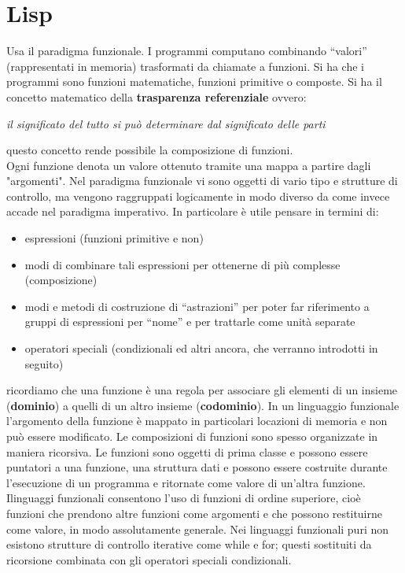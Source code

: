 \documentclass[a4paper,12pt, oneside]{book}
\begin{document}
\chapter{Lisp}
Usa il paradigma funzionale. I programmi computano combinando “valori” (rappresentati in memoria) trasformati da chiamate a funzioni. Si ha che i programmi sono funzioni matematiche, funzioni primitive o composte. Si ha il concetto matematico della \textbf{trasparenza referenziale} ovvero:
\begin{center}
\textit{il significato del tutto si può determinare dal significato delle parti}
\end{center}
questo concetto rende possibile la composizione di funzioni.\\
Ogni funzione denota un valore ottenuto tramite una mappa a
partire dagli "argomenti". Nel paradigma funzionale vi sono oggetti di vario tipo e strutture di controllo, ma vengono raggruppati logicamente in modo
diverso da come invece accade nel paradigma imperativo. In
particolare è utile pensare in termini di:
\begin{itemize}
\item espressioni (funzioni primitive e non)
\item modi di combinare tali espressioni per ottenerne di più
complesse (composizione)
\item modi e metodi di costruzione di “astrazioni” per poter far
riferimento a gruppi di espressioni per “nome” e per trattarle
come unità separate
\item operatori speciali (condizionali ed altri ancora, che verranno
introdotti in seguito)
\end{itemize}
ricordiamo che una funzione è una regola per associare gli elementi di un insieme (\textbf{dominio}) a quelli di un altro insieme (\textbf{codominio}). In un linguaggio funzionale l'argomento della funzione è mappato in particolari locazioni di memoria e non può essere modificato. Le composizioni di funzioni sono spesso organizzate in maniera ricorsiva. Le funzioni sono oggetti di prima classe e possono essere puntatori a una funzione, una struttura dati e possono essere costruite durante l’esecuzione di un programma e ritornate come valore di un’altra funzione. Ilinguaggi funzionali consentono l’uso di funzioni di ordine superiore, cioè funzioni che prendono altre funzioni come argomenti e che possono restituirne come valore, in modo assolutamente generale. Nei linguaggi funzionali puri non esistono strutture di controllo iterative come while e for; questi sostituiti da ricorsione combinata con gli operatori speciali condizionali.\\
\end{document}

